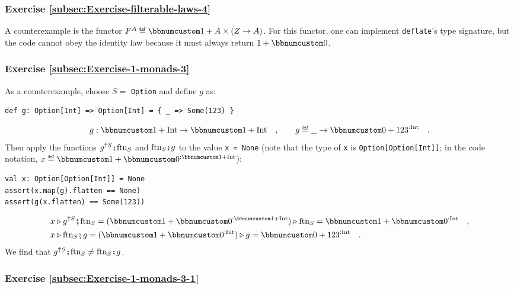 \subsubsection*{Exercise \ref{subsec:Exercise-filterable-laws-4}}

A counterexample is the functor $F^{A}\triangleq\bbnum 1+A\times\left(Z\rightarrow A\right)$.
For this functor, one can implement \lstinline!deflate!\textsf{'}s type signature,
but the code cannot obey the identity law because it must always return
$1+\bbnum 0$.


\subsubsection*{Exercise \ref{subsec:Exercise-1-monads-3}}

As a counterexample, choose $S=$ \lstinline!Option! and define $g$
as: 
\begin{lstlisting}
def g: Option[Int] => Option[Int] = { _ => Some(123) }
\end{lstlisting}
\[
g:\bbnum 1+\text{Int}\rightarrow\bbnum 1+\text{Int}\quad,\quad\quad g\triangleq\_\rightarrow\bbnum 0+123^{:\text{Int}}\quad.
\]
Then apply the functions $g^{\uparrow S}\bef\text{ftn}_{S}$ and $\text{ftn}_{S}\bef g$
to the value \lstinline!x = None! (note that the type of \lstinline!x!
is \lstinline!Option[Option[Int]]!; in the code notation, $x\triangleq\bbnum 1+\bbnum 0^{:\bbnum 1+\text{Int}}$):
\begin{lstlisting}
val x: Option[Option[Int]] = None
assert(x.map(g).flatten == None)
assert(g(x.flatten) == Some(123))
\end{lstlisting}
\begin{align*}
 & x\triangleright g^{\uparrow S}\bef\text{ftn}_{S}=(\bbnum 1+\bbnum 0^{:\bbnum 1+\text{Int}})\triangleright\text{ftn}_{S}=\bbnum 1+\bbnum 0^{:\text{Int}}\quad,\\
 & x\triangleright\text{ftn}_{S}\bef g=(\bbnum 1+\bbnum 0^{:\text{Int}})\triangleright g=\bbnum 0+123^{:\text{Int}}\quad.
\end{align*}
We find that $g^{\uparrow S}\bef\text{ftn}_{S}\neq\text{ftn}_{S}\bef g$. 

\subsubsection*{Exercise \ref{subsec:Exercise-1-monads-3-1}}

